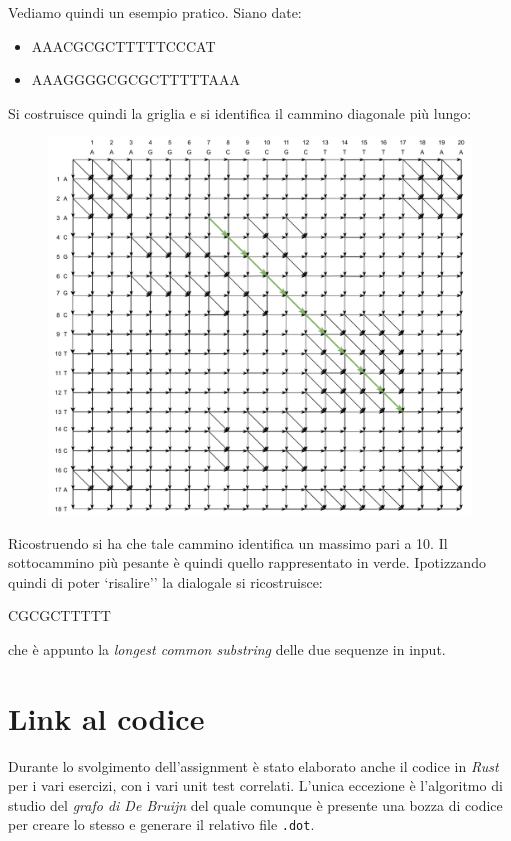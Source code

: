 \documentclass[a4paper,12pt, oneside]{book}
\begin{document}
Vediamo quindi un esempio pratico. Siano date:
\begin{itemize}
  \item AAACGCGCTTTTTCCCAT
  \item AAAGGGGCGCGCTTTTTAAA
\end{itemize}
\newpage
Si costruisce quindi la griglia e si identifica il cammino diagonale più lungo:
\begin{figure}[H]
  \centering
  \includegraphics[scale = 0.62]{img/es4.pdf}
\end{figure}
Ricostruendo si ha che tale cammino identifica un massimo pari a 10. Il
sottocammino più pesante è quindi quello rappresentato in verde. Ipotizzando
quindi di poter `risalire'' la dialogale si
ricostruisce: 
\begin{center}
  CGCGCTTTTT
\end{center}
che è appunto la \textit{longest common substring} delle due sequenze in input.
\chapter{Link al codice}
Durante lo svolgimento dell'assignment è stato elaborato anche il codice in
\textit{Rust} per i vari esercizi, con i vari unit test correlati. L'unica
eccezione è l'algoritmo di studio del \textit{grafo 
di De Bruijn} del quale comunque è presente una bozza di codice per creare lo
stesso e generare il relativo file \texttt{.dot}.
\end{document}
